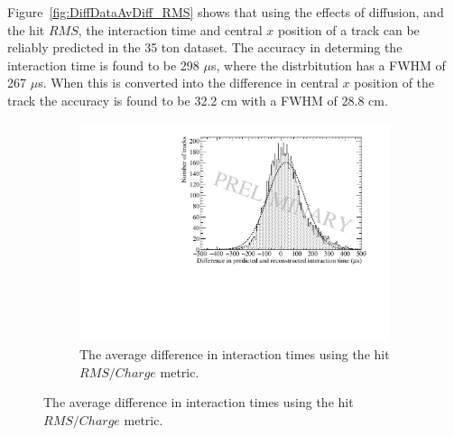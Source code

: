 Figure~\ref{fig:DiffDataAvDiff_RMS} shows that using the effects of diffusion, and the hit $RMS$, the interaction time and central $x$ position of a track can be reliably predicted in the 35 ton dataset. The accuracy in determing the interaction time is found to be 298 $\mu$s, where the distrbitution has a FWHM of 267 $\mu$s. When this is converted into the difference in central $x$ position of the track the accuracy is found to be 32.2 cm with a FWHM of 28.8 cm. \\

\begin{figure}[h!]
  \centering
  \begin{subfigure}{0.6\textwidth}
    \centering
    \includegraphics[width=\textwidth]{Data_AvTimeDiff_RMS_Int}
    \caption{The average difference in interaction times using the hit $RMS/Charge$ metric.}
    \label{fig:DiffDataAvDiff_RMS_Int_T}
  \end{subfigure}


\end{figure}
